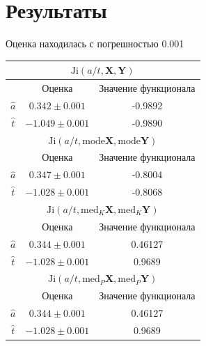 \documentclass[a4paper,12pt]{article}
\begin{document}
\newpage
\section{Результаты}
Оценка находилась с погрешностью 0.001

\begin{center}
\begin{tabular}{|c|c|c|}
\hline
\multicolumn{3}{|c|}{$\text{Ji} (a/t, \mathbf{X}, \mathbf{Y})$ }\\
\hline
&Оценка&Значение функционала\\
\hline
$\hat{a}$&$ 0.342\pm0.001$&-0.9892\\
\hline
$\hat{t}$&$-1.049\pm0.001$&-0.9890\\
\hline
\hline
\multicolumn{3}{|c|}{$\text{Ji} (a/t, \text{mode} \mathbf{X}, \text{mode} \mathbf{Y})$ }\\
\hline
&Оценка&Значение функционала\\
\hline
$\hat{a}$&$0.347\pm0.001$&-0.8004\\
\hline
$\hat{t}$&$-1.028\pm0.001$&-0.8068\\
\hline
\hline
\multicolumn{3}{|c|}{$\text{Ji} (a/t, \text{med}_K \mathbf{X}, \text{med}_K \mathbf{Y})$}\\
\hline
&Оценка&Значение функционала\\
\hline
$\hat{a}$&$0.344\pm0.001$&0.46127\\
\hline
\hline
$\hat{t}$&$-1.028\pm0.001$&0.9689\\
\hline
\multicolumn{3}{|c|}{$\text{Ji} (a/t, \text{med}_P \mathbf{X}, \text{med}_P \mathbf{Y})$}\\
\hline
&Оценка&Значение функционала\\
\hline
$\hat{a}$&$0.344\pm0.001$&0.46127\\
\hline
$\hat{t}$&$-1.028\pm0.001$&0.9689\\
\hline
\end{tabular}
\end{center}\\

\newpage
\end{document}
